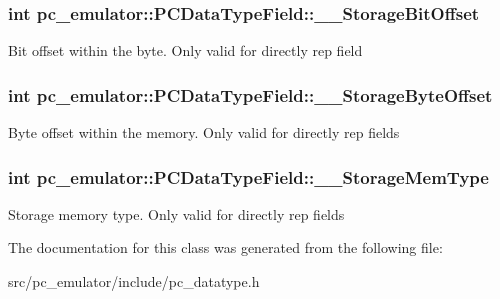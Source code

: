 \subsubsection[{\texorpdfstring{\+\_\+\+\_\+\+Storage\+Bit\+Offset}{__StorageBitOffset}}]{\setlength{\rightskip}{0pt plus 5cm}int pc\+\_\+emulator\+::\+P\+C\+Data\+Type\+Field\+::\+\_\+\+\_\+\+Storage\+Bit\+Offset}\hypertarget{classpc__emulator_1_1PCDataTypeField_a0a83c264268f41b225a11e549b5309e7}{}\label{classpc__emulator_1_1PCDataTypeField_a0a83c264268f41b225a11e549b5309e7}
Bit offset within the byte. Only valid for directly rep field 
\subsubsection[{\texorpdfstring{\+\_\+\+\_\+\+Storage\+Byte\+Offset}{__StorageByteOffset}}]{\setlength{\rightskip}{0pt plus 5cm}int pc\+\_\+emulator\+::\+P\+C\+Data\+Type\+Field\+::\+\_\+\+\_\+\+Storage\+Byte\+Offset}\hypertarget{classpc__emulator_1_1PCDataTypeField_ad4175b87382c2c7eac3c59cf411196de}{}\label{classpc__emulator_1_1PCDataTypeField_ad4175b87382c2c7eac3c59cf411196de}
Byte offset within the memory. Only valid for directly rep fields 
\subsubsection[{\texorpdfstring{\+\_\+\+\_\+\+Storage\+Mem\+Type}{__StorageMemType}}]{\setlength{\rightskip}{0pt plus 5cm}int pc\+\_\+emulator\+::\+P\+C\+Data\+Type\+Field\+::\+\_\+\+\_\+\+Storage\+Mem\+Type}\hypertarget{classpc__emulator_1_1PCDataTypeField_a7d4755f31dd2b641e7ea2fbbf9df82f6}{}\label{classpc__emulator_1_1PCDataTypeField_a7d4755f31dd2b641e7ea2fbbf9df82f6}
Storage memory type. Only valid for directly rep fields 

The documentation for this class was generated from the following file\+:\begin{DoxyCompactItemize}
\item 
src/pc\+\_\+emulator/include/pc\+\_\+datatype.\+h\end{DoxyCompactItemize}
